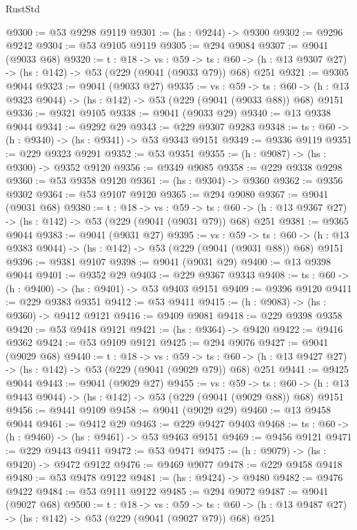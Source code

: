 \begin{lexlean}{RustStd}
\begin{coremodule}
@9300 := @53 @9298 @9119
@9301 := (hs : @9244) -> @9300
@9302 := @9296 @9242
@9304 := @53 @9105 @9119
@9305 := @294 @9084
@9307 := @9041 (@9033 @68)
@9320 := {t : @18} ->
  {vs : @59} ->
  {ts : @60} -> (h : @13 @9307 @27) -> (hs : @142) -> @53 (@229 (@9041 (@9033 @79)) @68) @251
@9321 := @9305 @9044
@9323 := @9041 (@9033 @27)
@9335 := {vs : @59} ->
  {ts : @60} -> (h : @13 @9323 @9044) -> (hs : @142) -> @53 (@229 (@9041 (@9033 @88)) @68) @9151
@9336 := @9321 @9105
@9338 := @9041 (@9033 @29)
@9340 := @13 @9338 @9044
@9341 := @9292 @29
@9343 := @229 @9307 @9283
@9348 := {ts : @60} -> (h : @9340) -> (hs : @9341) -> @53 @9343 @9151
@9349 := @9336 @9119
@9351 := @229 @9323 @9291
@9352 := @53 @9351
@9355 := (h : @9087) -> (hs : @9300) -> @9352 @9120
@9356 := @9349 @9085
@9358 := @229 @9338 @9298
@9360 := @53 @9358 @9120
@9361 := (hs : @9304) -> @9360
@9362 := @9356 @9302
@9364 := @53 @9107 @9120
@9365 := @294 @9080
@9367 := @9041 (@9031 @68)
@9380 := {t : @18} ->
  {vs : @59} ->
  {ts : @60} -> (h : @13 @9367 @27) -> (hs : @142) -> @53 (@229 (@9041 (@9031 @79)) @68) @251
@9381 := @9365 @9044
@9383 := @9041 (@9031 @27)
@9395 := {vs : @59} ->
  {ts : @60} -> (h : @13 @9383 @9044) -> (hs : @142) -> @53 (@229 (@9041 (@9031 @88)) @68) @9151
@9396 := @9381 @9107
@9398 := @9041 (@9031 @29)
@9400 := @13 @9398 @9044
@9401 := @9352 @29
@9403 := @229 @9367 @9343
@9408 := {ts : @60} -> (h : @9400) -> (hs : @9401) -> @53 @9403 @9151
@9409 := @9396 @9120
@9411 := @229 @9383 @9351
@9412 := @53 @9411
@9415 := (h : @9083) -> (hs : @9360) -> @9412 @9121
@9416 := @9409 @9081
@9418 := @229 @9398 @9358
@9420 := @53 @9418 @9121
@9421 := (hs : @9364) -> @9420
@9422 := @9416 @9362
@9424 := @53 @9109 @9121
@9425 := @294 @9076
@9427 := @9041 (@9029 @68)
@9440 := {t : @18} ->
  {vs : @59} ->
  {ts : @60} -> (h : @13 @9427 @27) -> (hs : @142) -> @53 (@229 (@9041 (@9029 @79)) @68) @251
@9441 := @9425 @9044
@9443 := @9041 (@9029 @27)
@9455 := {vs : @59} ->
  {ts : @60} -> (h : @13 @9443 @9044) -> (hs : @142) -> @53 (@229 (@9041 (@9029 @88)) @68) @9151
@9456 := @9441 @9109
@9458 := @9041 (@9029 @29)
@9460 := @13 @9458 @9044
@9461 := @9412 @29
@9463 := @229 @9427 @9403
@9468 := {ts : @60} -> (h : @9460) -> (hs : @9461) -> @53 @9463 @9151
@9469 := @9456 @9121
@9471 := @229 @9443 @9411
@9472 := @53 @9471
@9475 := (h : @9079) -> (hs : @9420) -> @9472 @9122
@9476 := @9469 @9077
@9478 := @229 @9458 @9418
@9480 := @53 @9478 @9122
@9481 := (hs : @9424) -> @9480
@9482 := @9476 @9422
@9484 := @53 @9111 @9122
@9485 := @294 @9072
@9487 := @9041 (@9027 @68)
@9500 := {t : @18} ->
  {vs : @59} ->
  {ts : @60} -> (h : @13 @9487 @27) -> (hs : @142) -> @53 (@229 (@9041 (@9027 @79)) @68) @251

\end{coremodule}
\end{lexlean}
